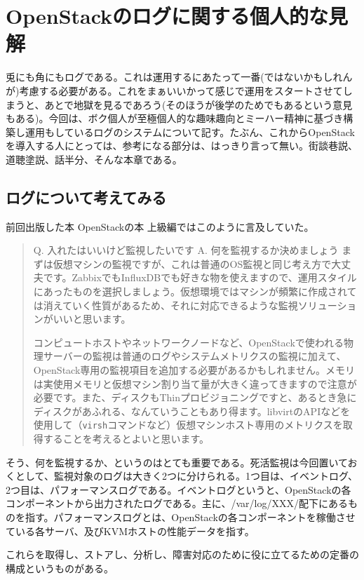 \chapter{OpenStackのログに関する個人的な見解}
\setcounter{page}{1}

兎にも角にもログである。これは運用するにあたって一番(ではないかもしれんが)考慮する必要がある。これをまぁいいかって感じで運用をスタートさせてしまうと、あとで地獄を見るであろう(そのほうが後学のためでもあるという意見もある)。今回は、ボク個人が至極個人的な趣味趣向とミーハー精神に基づき構築し運用もしているログのシステムについて記す。たぶん、これからOpenStackを導入する人にとっては、参考になる部分は、はっきり言って無い。街談巷説、道聴塗説、話半分、そんな本章である。

\section{ログについて考えてみる}
前回出版した本 OpenStackの本 上級編ではこのように言及していた。

\begin{quotation}
	Q. 入れたはいいけど監視したいです
	A. 何を監視するか決めましょう
	まずは仮想マシンの監視ですが、これは普通のOS監視と同じ考え方で大丈夫です。ZabbixでもInfluxDBでも好きな物を使えますので、運用スタイルにあったものを選択しましょう。仮想環境ではマシンが頻繁に作成されては消えていく性質があるため、それに対応できるような監視ソリューションがいいと思います。

	コンピュートホストやネットワークノードなど、OpenStackで使われる物理サーバーの監視は普通のログやシステムメトリクスの監視に加えて、OpenStack専用の監視項目を追加する必要があるかもしれません。メモリは実使用メモリと仮想マシン割り当て量が大きく違ってきますので注意が必要です。また、ディスクもThinプロビジョニングですと、あるとき急にディスクがあふれる、なんていうこともあり得ます。libvirtのAPIなどを使用して（\verb|virsh|コマンドなど）仮想マシンホスト専用のメトリクスを取得することを考えるとよいと思います。
\end{quotation}

そう、何を監視するか、というのはとても重要である。死活監視は今回置いておくとして、監視対象のログは大きく2つに分けられる。1つ目は、イベントログ、2つ目は、パフォーマンスログである。イベントログというと、OpenStackの各コンポーネントから出力されたログである。主に、/var/log/XXX/配下にあるものを指す。パフォーマンスログとは、OpenStackの各コンポーネントを稼働させている各サーバ、及びKVMホストの性能データを指す。

これらを取得し、ストアし、分析し、障害対応のために役に立てるための定番の構成というものがある。

